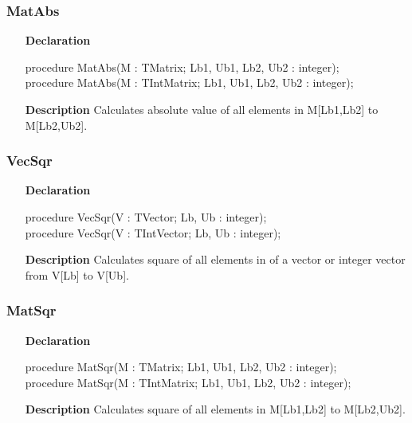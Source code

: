 \documentclass[12pt,a4paper,oneside]{report}
\newcommand{\declarationitem}[1]{\textbf{#1}}
\newcommand{\descriptiontitle}[1]{\textbf{#1}}
\begin{document}
\subsubsection{MatAbs}
\label{uvecfunc:MatAbs}
\begin{itemize}
	\item[\declarationitem{Declaration}\hfill]
	\begin{flushleft}
procedure MatAbs(M : TMatrix; Lb1, Ub1, Lb2, Ub2 : integer);\\ \vspace{4pt}	 
procedure MatAbs(M : TIntMatrix; Lb1, Ub1, Lb2, Ub2 : integer);
	\end{flushleft}
	\item[\descriptiontitle{Description}\hfill]
	Calculates absolute value of all elements in M[Lb1,Lb2] to M[Lb2,Ub2].
\end{itemize}
\subsubsection{VecSqr}
\label{uvecfunc:VecSqr}
\begin{itemize}
	\item[\declarationitem{Declaration}\hfill]
	\begin{flushleft}
procedure VecSqr(V : TVector; Lb, Ub : integer); \\ \vspace{4pt}	
procedure VecSqr(V : TIntVector; Lb, Ub : integer); 
	\end{flushleft}
	\item[\descriptiontitle{Description}\hfill]
	Calculates square of all elements in of a vector or integer vector from V[Lb] to V[Ub].
\end{itemize}
\subsubsection{MatSqr}
\label{uvecfunc:MatSqr}
\begin{itemize}
	\item[\declarationitem{Declaration}\hfill]
	\begin{flushleft}
procedure MatSqr(M : TMatrix; Lb1, Ub1, Lb2, Ub2 : integer); \\ \vspace{4pt} 
procedure MatSqr(M : TIntMatrix; Lb1, Ub1, Lb2, Ub2 : integer); 
	\end{flushleft}
	\item[\descriptiontitle{Description}\hfill]
		Calculates square of all elements in M[Lb1,Lb2] to M[Lb2,Ub2].
\end{itemize}
\end{document}
